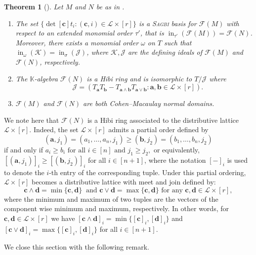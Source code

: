 \documentclass[11pt,a4paper,reqno,dvipsnames]{amsart}
\theoremstyle{plain}
\newtheorem{Theorem}{Theorem}[section]
\theoremstyle{definition}
\newtheorem{Assumptions and Discussion}[Theorem]{Assumptions and Discussion}
\theoremstyle{remark}
\def\ini{\operatorname{in}}
\def\KK{{\mathbb K}}
\newcommand\bda{{\bm a}}
\newcommand\bdb{{\bm b}}
\newcommand\bdc{{\bm c}}
\newcommand\bdd{{\bm d}}
\newcommand\calF{\mathcal{F}}
\newcommand\calJ{\mathcal{J}}
\newcommand\calK{\mathcal{K}}
\newcommand\calL{\mathcal{L}}
\newcommand{\Lr}{\ensuremath{\calL\times[r]}}
\begin{document}
\begin{Theorem}[{\cite[Theorem~4.8. 5.5, Corollary~4.10. 5.7]{LinShenLadder}}] \label{FiberLadder}
Let $M$ and $N$ be as in .
\begin{enumerate}[a]
    \item The set $
    \{\det[\bdc] t_i : (\bdc, i) \in \calL\times [r]\}$ is a \textsc{Sagbi} basis for $\calF(M)$ with respect to an extended monomial order $\tau'$, that is $\ini_{\tau'}(\calF(M))=\calF(N)$. Moreover, there exists a monomial  order $\omega$ on $T$ such that $\ini_{\omega}( \calK)=\ini_{\sigma} (\calJ)$, where $\calK, \calJ$ are the defining ideals of $\calF(M)$ and $\calF(N)$, respectively. 
    
   
    \item    The $\KK$-algebra $\calF(N)$ is a Hibi ring and is isomorphic to $T/\calJ$ where 
    $$ \quad \calJ=(T_{\bda}T_{\bdb}-T_{\bda \wedge \bdb}T_{\bda \vee \bdb}: \bda, \bdb \in \calL\times[r]).$$

    \item  $\calF(M)$ and $\calF(N)$ are both Cohen--Macaulay normal domains.
\end{enumerate}
\end{Theorem}

We note here that $\calF(N)$ is a Hibi ring associated to the distributive lattice $\Lr$. Indeed, the set $\Lr$ admits a partial order defined by 
\[(\bda,j_1)=(a_1,\ldots,a_n,j_1)\ge (\bdb,j_2)=(b_1,\ldots, b_n,j_2)\]  if and only if 
\(a_i\ge b_i \text{ for all } i\in [n] \text{ and } j_1\ge j_2 ,\) or equivalently, $[(\bda,j_1)]_i\ge [(\bdb,j_2)]_i$ for all $i\in [n+1]$, where the notation $[-]_i$ is used to denote the $i$-th entry of the corresponding tuple.
 Under this partial ordering, $\calL \times [r]$ becomes a distributive lattice with meet and join defined by:
 \[  
 \bdc\wedge \bdd=\min\{\bdc, \bdd\} \ \mbox{ and } \bdc\vee \bdd=\max\{\bdc, \bdd\} \mbox{ for any } \bdc, \bdd\in \Lr,\]
 where the minimum and maximum of two tuples  are the vectors of the component wise minimum and maximum, respectively. In other words,  for  $\bdc, \bdd\in \Lr$ we have $[\bdc\wedge \bdd]_i=\min\{[\bdc]_i, [\bdd]_i\}$ and $[\bdc\vee \bdd]_i=\max\{[\bdc]_i, [\bdd]_i\}$ for all $i\in [n+1]$.

 We close this section with the following remark.
\end{document}

